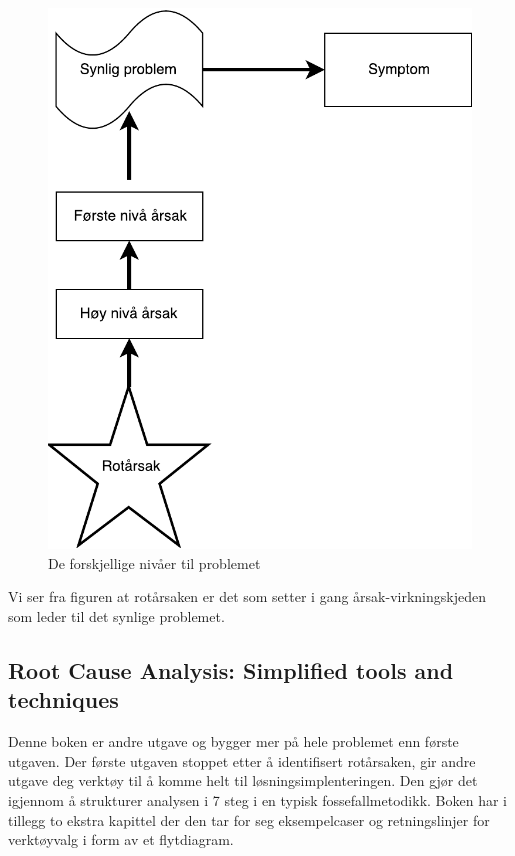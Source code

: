 \begin{figure}[H]
    \centering
    \includegraphics[scale=0.6]{main/bilder/nivaa.pdf}
    \caption[Nivåer av årsaker]{De forskjellige nivåer til problemet}
    \label{fig:nivaa}
\end{figure}

Vi ser fra figuren at rotårsaken er det som setter i gang årsak-virkningskjeden som leder til det synlige problemet. 

\subsection{Root Cause Analysis: Simplified tools and techniques}
Denne boken er andre utgave og bygger mer på hele problemet enn første utgaven. Der første utgaven stoppet etter å identifisert rotårsaken, gir andre utgave deg verktøy til å komme helt til løsningsimplenteringen. Den gjør det igjennom å strukturer analysen i 7 steg i en typisk fossefallmetodikk. Boken har i tillegg to ekstra kapittel der den tar for seg eksempelcaser og retningslinjer for verktøyvalg i form av et flytdiagram. 

